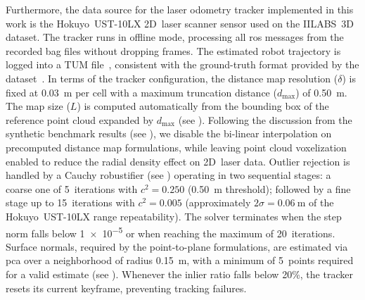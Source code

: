 Furthermore, the data source for the laser odometry tracker implemented in this
work is the Hokuyo~UST-10LX 2D~laser scanner sensor used on the
IILABS~3D~\cite{ribeiro:access:2025} dataset.
The tracker runs in offline mode, processing all \gls{ros} messages
from the recorded bag files without dropping frames.
The estimated robot trajectory is logged into a TUM file~\cite{sturm:iros:2012},
consistent with the ground-truth format provided by the
dataset~\cite{ribeiro:access:2025}.
In terms of the tracker configuration, the distance map resolution ($\delta$)
is fixed at \SI{0.03}{\metre} per cell with a maximum truncation distance
($d_{\max}$) of \SI{0.50}{\metre}. The map size ($L$) is computed automatically
from the bounding box of the reference point cloud expanded by $d_{\max}$
(see ).
Following the discussion from the synthetic benchmark results
(see ), we disable the
bi-linear interpolation on precomputed distance map formulations, while
leaving point cloud voxelization enabled to reduce the radial density effect on
2D~laser data. Outlier rejection is handled by a Cauchy robustifier
(see )
operating in two sequential stages:
a coarse one of 5~iterations with $c^2=0.250$ (\SI{0.50}{\metre} threshold);
followed by a fine stage up to 15~iterations with $c^2 = 0.005$ (approximately
$2\sigma = \SI{0.06}{\metre}$ of the Hokuyo~UST-10LX range repeatability).
The solver terminates when the step norm falls below \num{1e-5} or when reaching
the maximum of 20~iterations.
Surface normals, required by the point-to-plane formulations,
are estimated via \gls{pca} over a neighborhood of radius
\SI{0.15}{\metre}, with a minimum of 5~points required for
a valid estimate (see ).
Whenever the inlier ratio falls below 20\%, the tracker resets its current
keyframe, preventing tracking failures.


